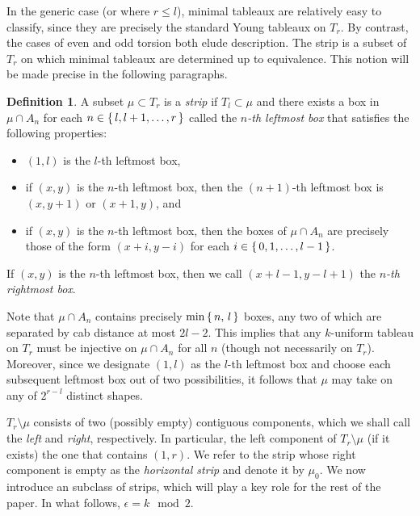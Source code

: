\documentclass[11pt,reqno]{amsart}
\theoremstyle{definition}
\newtheorem{definition}{Definition}[section]
\theoremstyle{problem}
\theoremstyle{plain}
\theoremstyle{remark}
\theoremstyle{theorem}
\numberwithin{equation}{section}
\numberwithin{figure}{section}
\begin{document}
In the generic case (or where $r \leq l$), minimal tableaux are
relatively easy to classify, since they are precisely the standard
Young tableaux on $T_r$.  By contrast, the cases of even and odd
torsion both elude description.  The strip is a subset of $T_r$ on
which minimal tableaux are determined up to equivalence.  This notion
will be made precise in the following paragraphs.

\begin{definition}
  A subset $\mu \subset T_r$ is a \textit{strip} if $T_l \subset \mu$
  and there exists a box in $\mu \cap A_n$ for each
  $n \in \set{l,l+1,\ldots,r}$ called the \emph{$n$-th leftmost box}
  that satisfies the following properties:
  \begin{itemize}
  \item $(1,l)$ is the $l$-th leftmost box, 
  \item if $(x,y)$ is the $n$-th leftmost box, then the
    $(n+1)$-th leftmost box is $(x,y+1)$ or $(x+1,y)$, and
  \item if $(x,y)$ is the $n$-th leftmost box, then the boxes of
    $\mu \cap A_n$ are precisely those of the form $(x+i,y-i)$ for
    each $i \in \set{0,1,\ldots,l-1}$.
  \end{itemize}
  If $(x,y)$ is the $n$-th leftmost box, then we call $(x+l-1,y-l+1)$
  the \textit{$n$-th rightmost box}.
\end{definition}
  
Note that $\mu \cap A_n$ contains precisely $\min \set{n,\,l}$ boxes, any two
of which are separated by cab distance at most $2l-2$.  This implies
that any $k$-uniform tableau on $T_r$ must be injective on $\mu \cap A_n$ for
all $n$ (though not necessarily on $T_r$).  Moreover, since we
designate $(1,l)$ as the $l$-th leftmost box and choose each
subsequent leftmost box out of two possibilities, it follows that
$\mu$ may take on any of $2^{r-l}$ distinct shapes.

$T_r\setminus\mu$ consists of two (possibly empty) contiguous
components, which we shall call the \emph{left} and \emph{right}, respectively.  In
particular, the left component of $T_r\setminus\mu$ (if it exists) the
one that contains $(1,r)$.  We refer to the strip whose right component is empty as
 the \textit{horizontal strip} and denote it by $\mu_0$. 
We now introduce an subclass of  strips, which will play a key role for the rest of the paper. In what follows, $\epsilon=k\mod 2$. 
\end{document}
